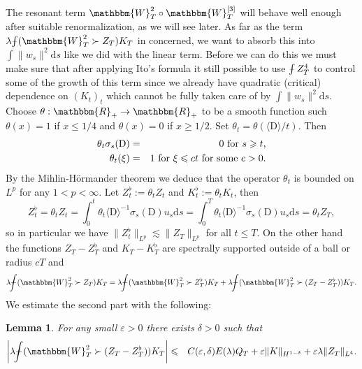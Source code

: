 \documentclass[11pt, oneside]{article}   	%
\newcommand{\assign}{:=}
\newcommand{\mathD}{\mathrm{D}}
\newcommand{\mathd}{\mathrm{d}}
\newtheorem{lemma}{Lemma}
\def\Xint#1{\mathchoice
{\XXint\displaystyle\textstyle{#1}}%
{\XXint\textstyle\scriptstyle{#1}}%
{\XXint\scriptstyle\scriptscriptstyle{#1}}%
{\XXint\scriptscriptstyle\scriptscriptstyle{#1}}%
\!\int}
\def\XXint#1#2#3{{\setbox0=\hbox{$#1{#2#3}{\int}$ }
\vcenter{\hbox{$#2#3$ }}\kern-.6\wd0}}
\def\dashint{\Xint-}
\newcommand{\bint}{\dashint}
\begin{document}
The resonant term $\mathbbm{W}^2_T \circ \mathbbm{W}_T^{[3]}$ will behave well
enough after suitable renormalization, as we will see later. As far as the
term $\lambda \bint (\mathbbm{W}^2_T \succ Z_T) K_T$ in concerned, we want to
absorb this into $\int \| w_s \|^2 \mathd s$ like we did with the linear term.
Before we can do this we must make sure that after applying Ito's formula it
still possible to use $\bint Z^4_T$ to control some of the growth of this term
since we already have quadratic (critical) dependence on $(K_t)_t$ which
cannot be fully taken care of by $\int \| w_s \|^2 \mathd s$. Choose $\theta :
\mathbbm{R}_+ \rightarrow \mathbbm{R}_+$ to be a smooth function such $\theta
(x) = 1$ if $x \leqslant 1 / 4$ and $\theta (x) = 0$ if $x \geqslant 1 / 2$.
Set $\theta_t = \theta (\langle \mathD \rangle / t)$. Then \
\begin{eqnarray*}
  \theta_t \sigma_s (\mathD) & = & \text{$0$ for $s \geqslant t$,}\\
  \theta_t (\xi) & = & \text{$1$ for $\xi \leqslant c t$ \text{for some} $c >
  0$.}
\end{eqnarray*}
By the Mihlin-H{\"o}rmander theorem we deduce that the operator $\theta_t$ is
bounded on $L^p$ for any $1 < p < \infty$. Let $Z_t^{\flat} \assign \theta_t
Z_t$ and $K^{\flat}_t \assign \theta_t K_t$, then \
\[ Z_t^{\flat} = \theta_t Z_t = \int_0^t \theta_t \langle \mathD \rangle^{-
   1} \sigma_s (\mathD) u_s \mathd s = \int_0^T \theta_t \langle \mathD
   \rangle^{- 1} \sigma_s (\mathD) u_s \mathd s = \theta_t Z_T, \]
so in particular we have $\| Z_t^{\flat} \|_{L^p} \lesssim \| Z_T \|_{L^p}$
for all $t \leqslant T$. On the other hand the functions $Z_T - Z_T^{\flat}$
and $K_T - K_T^{\flat}$ are spectrally supported outside of a ball or radius
$c T$ and
\[ \lambda \bint (\mathbbm{W}^2_T \succ Z_T) K_T = \lambda \bint
   (\mathbbm{W}^2_T \succ Z^{\flat}_T) K_T + \lambda \bint (\mathbbm{W}^2_T
   \succ (Z_T - Z^{\flat}_T)) K_T . \]
We estimate the second part with the following:

\begin{lemma}
  For any small $\varepsilon > 0$ there exists $\delta > 0$ such that
  \begin{eqnarray*}
    \left| \lambda \bint (\mathbbm{W}^2_T \succ (Z_T - Z^{\flat}_T)) K_T
    \right| & \leqslant & C (\varepsilon, \delta) E (\lambda) Q_T +
    \varepsilon \| K \|_{H^{1 - \delta}} + \varepsilon \lambda \| Z_T \|_{L^4}
    .
  \end{eqnarray*}
\end{lemma}
\end{document}
